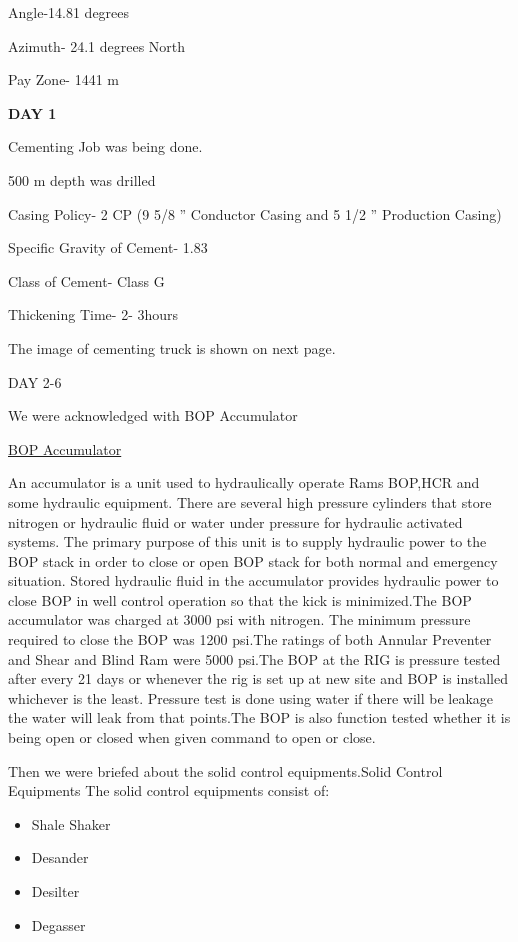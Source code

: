 \documentclass[11pt,a4paper]{report}
\begin{document}
Angle-14.81 degrees

Azimuth- 24.1 degrees North

Pay Zone- 1441 m

\textbf{DAY \hfill 1}

Cementing Job was being done.

500 m depth was drilled

Casing Policy- 2 CP (9 5/8 ” Conductor Casing and 5 1/2 ” Production Casing)

Specific Gravity of Cement- 1.83

Class of Cement- Class G

Thickening Time- 2- 3hours

The image of cementing truck is shown on next page.

DAY 2-6

We were acknowledged with BOP Accumulator


\underline{BOP Accumulator}

An accumulator is a unit used to hydraulically operate Rams BOP,HCR and some hydraulic equipment. There are several high pressure cylinders that store nitrogen or hydraulic fluid or water under pressure for hydraulic activated systems. The primary purpose of this unit is to supply hydraulic power to the BOP stack in order to close or open BOP stack for both normal and emergency situation. Stored hydraulic fluid in the accumulator provides hydraulic power to close BOP in well control operation so that the kick is minimized.The BOP accumulator was charged at 3000 psi with nitrogen. The minimum pressure required to close the BOP was 1200 psi.The ratings of both Annular Preventer and Shear and Blind Ram were 5000 psi.The BOP at the RIG is pressure tested after every 21 days or whenever the rig is set up at new site and BOP is installed whichever is the least. Pressure test is done using water if there will be leakage the water will leak from that points.The BOP is also function tested whether it is being open or closed when given command to open or close.


\noindent Then we were briefed about the solid control equipments.Solid Control Equipments The solid control equipments consist of:

\begin{itemize}

\item Shale Shaker
\item Desander
\item Desilter
\item Degasser

\end{itemize}

 
\end{document}
